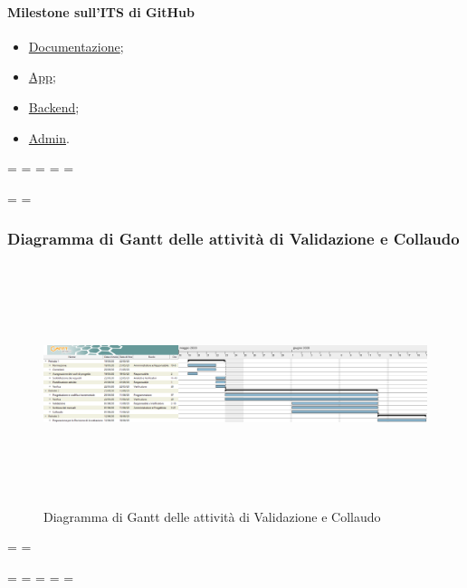 \paragraph{Milestone sull'ITS di GitHub}
\begin{itemize}
	\item \href{https://github.com/qb-team/Stalker-Documentazione/milestone/17}{Documentazione};
	\item \href{https://github.com/qb-team/Stalker-App/milestone/6}{App};
	\item \href{https://github.com/qb-team/Stalker-Backend/milestone/7}{Backend};
	\item \href{https://github.com/qb-team/Stalker-Admin/milestone/7}{Admin}.
\end{itemize}

\newpage
\paperwidth=\pdfpageheight
\paperheight=\pdfpagewidth
\pdfpageheight=\paperheight
\pdfpagewidth=\paperwidth
\headwidth=\textheight

\begingroup 
\vsize=\textwidth
\hsize=\textheight

\subsubsection{Diagramma di Gantt delle attività di Validazione e Collaudo}
\pagestyle{empty}
\begin{figure}[h]
	\centering
	\includegraphics[height = 7cm, width = 24.5cm]{Sezioni/Immagini/DiagrammiGantt/Validazione.png}
	\caption{Diagramma di Gantt delle attività di Validazione e Collaudo}
\end{figure}

\textwidth=\hsize
\textheight=\vsize

\endgroup
\newpage
\paperwidth=\pdfpageheight
\paperheight=\pdfpagewidth
\pdfpageheight=\paperheight
\pdfpagewidth=\paperwidth
\headwidth=\textwidth